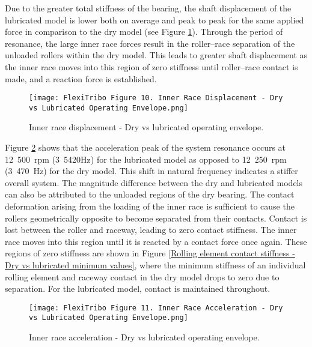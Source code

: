 Due to the greater total stiffness of the bearing, the shaft displacement of the lubricated model is lower both on average and peak to peak for the same applied force in comparison to the dry model (see Figure \ref{Inner race displacement - Dry vs lubricated operating envelope}). Through the period of resonance, the large inner race forces result in the roller–race separation of the unloaded rollers within the dry model. This leads to greater shaft displacement as the inner race moves into this region of zero stiffness until roller–race contact is made, and a reaction force is established.

\begin{figure}
	\centering  
	\texttt{[image: FlexiTribo Figure 10. Inner Race Displacement - Dry vs Lubricated Operating Envelope.png]}
	\caption{Inner race displacement - Dry vs lubricated operating envelope.}
	\label{Inner race displacement - Dry vs lubricated operating envelope}
\end{figure} 

Figure \ref{Inner race acceleration - Dry vs lubricated operating envelope} shows that the acceleration peak of the system resonance occurs at 12~500~$\mathrm{rpm}$ (3~5420$\mathrm{Hz}$) for the lubricated model as opposed to 12~250~$\mathrm{rpm}$ (3~470~$\mathrm{Hz}$) for the dry model. This shift in natural frequency indicates a stiffer overall system. The magnitude difference between the dry and lubricated models can also be attributed to the unloaded regions of the dry bearing. The contact deformation arising from the loading of the inner race is sufficient to cause the rollers geometrically opposite to become separated from their contacts. Contact is lost between the roller and raceway, leading to zero contact stiffness. The inner race moves into this region until it is reacted by a contact force once again. These regions of zero stiffness are shown in Figure \ref{Rolling element contact stiffness - Dry vs lubricated minimum values}, where the minimum stiffness of an individual rolling element and raceway contact in the dry model drops to zero due to separation. For the lubricated model, contact is maintained throughout.

\begin{figure}
	\centering  
	\texttt{[image: FlexiTribo Figure 11. Inner Race Acceleration - Dry vs Lubricated Operating Envelope.png]}
	\caption{Inner race acceleration - Dry vs lubricated operating envelope.}
	\label{Inner race acceleration - Dry vs lubricated operating envelope}
\end{figure}

